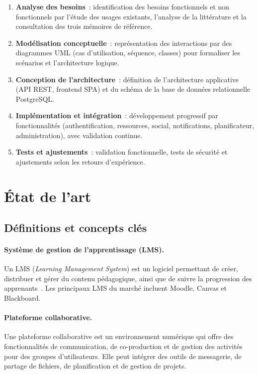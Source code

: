 \begin{enumerate}
  \item \textbf{Analyse des besoins}~: identification des besoins fonctionnels et non fonctionnels par l'\'etude des usages existants, l'analyse de la litt\'erature et la consultation des trois m\'emoires de r\'ef\'erence.
  \item \textbf{Mod\'elisation conceptuelle}~: repr\'esentation des interactions par des diagrammes UML (cas d'utilisation, s\'equence, classes) pour formaliser les sc\'enarios et l'architecture logique.
  \item \textbf{Conception de l'architecture}~: d\'efinition de l'architecture applicative (API REST, frontend SPA) et du sch\'ema de la base de donn\'ees relationnelle PostgreSQL.
  \item \textbf{Impl\'ementation et int\'egration}~: d\'eveloppement progressif par fonctionnalit\'es (authentification, ressources, social, notifications, planificateur, administration), avec validation continue.
  \item \textbf{Tests et ajustements}~: validation fonctionnelle, tests de s\'ecurit\'e et ajustements selon les retours d'exp\'erience.
\end{enumerate}

\section{\'Etat de l'art}
\label{sec:etat_art}

\subsection{D\'efinitions et concepts cl\'es}

\paragraph{Syst\`eme de gestion de l'apprentissage (LMS).}
Un LMS (\textit{Learning Management System}) est un logiciel permettant de cr\'eer, distribuer et g\'erer du contenu p\'edagogique, ainsi que de suivre la progression des apprenants~\cite{moodle_overview_2026}. Les principaux LMS du march\'e incluent Moodle, Canvas et Blackboard.

\paragraph{Plateforme collaborative.}
Une plateforme collaborative est un environnement num\'erique qui offre des fonctionnalit\'es de communication, de co-production et de gestion des activit\'es pour des groupes d'utilisateurs. Elle peut int\'egrer des outils de messagerie, de partage de fichiers, de planification et de gestion de projets.

